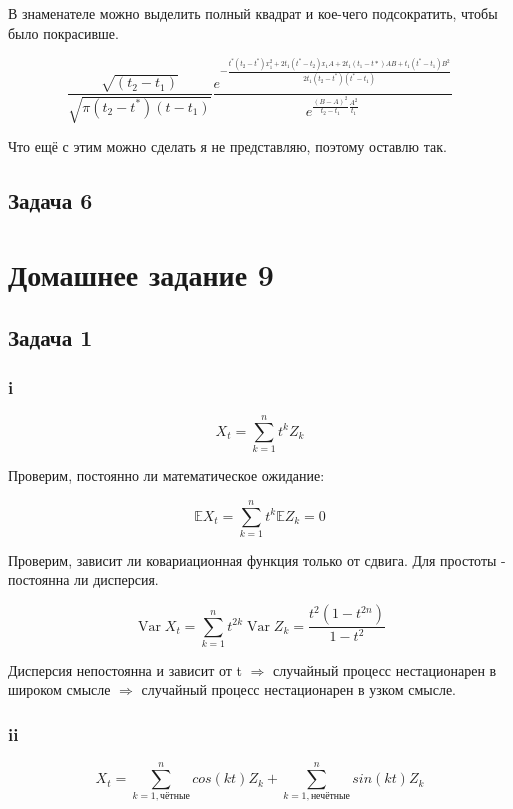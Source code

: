 \documentclass[a4paper,12pt]{article}
\def \mbb{\mathbb}
\DeclareMathOperator{\Var}{Var}
\def \E{\mbb{E}}
\begin{document}
В знаменателе можно выделить полный квадрат и кое-чего подсократить, чтобы было покрасивше.

\[ \frac{\sqrt{(t_{2}-t_{1})}}{\sqrt{\pi \left(t_{2}-t^{*}\right)\left(t-t_{1}\right)}} \frac{e^{-\frac{t^{*}\left(t_{2}-t^{*}\right) x_{1}^{2}+2 t_{1}\left(t^{*}-t_{2}\right) x_{1} A + 2 t_{1}\left(t_1-t*\right) A B +t_{1}\left(t^{*}-t_{1}\right) B^{2}}{2 t_{1}\left(t_{2}-t^{*}\right)\left(t^{*}-t_{1}\right)}}}{e^{\frac{(B - A)^2}{t_2 - t_1}\frac{A^2}{t_1}}} \]

Что ещё с этим можно сделать я не представляю, поэтому оставлю так.

\subsection{Задача 6}


\section{Домашнее задание 9}

\subsection{Задача 1}

\subsubsection{i}
\[ X_t = \sum_{k = 1}^{n} t^k Z_k\]

Проверим, постоянно ли математическое ожидание:

\[ \E X_t = \sum_{k = 1}^{n} t^k \E Z_k = 0\]

Проверим, зависит ли ковариационная функция только от сдвига. Для простоты - постоянна ли дисперсия. 

\[ \Var X_t = \sum_{k = 1}^{n} t^{2k} \Var Z_k = \frac{t^2(1-t^{2n})}{1 - t^2} \]

Дисперсия непостоянна и зависит от t $ \Rightarrow $ случайный процесс нестационарен в широком смысле $ \Rightarrow $ случайный процесс нестационарен в узком смысле.



\subsubsection{ii}

\[ X_t = \sum_{k=1, \text{чётные}}^{n} cos(kt)  Z_k + \sum_{k=1, \text{нечётные}}^{n}  sin(kt) Z_k\]
\end{document}
